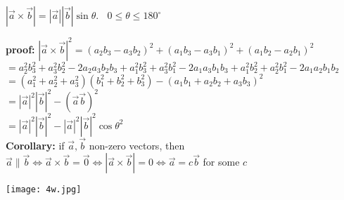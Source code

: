 \begin{theorem}
$|\overrightarrow{a}\times\overrightarrow{b}|=|\overrightarrow{a}||\overrightarrow{b}|\sin{\theta}.~~~~0\leq\theta\leq180^\circ$\\
\end{theorem}
{\color{smalt(darkpowderblue)}\textbf{proof:}}
$|\overrightarrow{a}\times\overrightarrow{b}|^2=(a_2b_3-a_3b_2)^2+(a_1b_3-a_3b_1)^2+(a_1b_2-a_2b_1)^2$\\
$=a_2^2b_3^2+a_3^2b_2^2-2a_2a_3b_2b_3+a_1^2b_3^2+a_3^2b_1^2-2a_1a_3b_1b_3+a_1^2b_2^2+a_2^2b_1^2-2a_1a_2b_1b_2$\\
$=(a_1^2+a_2^2+a_3^2)(b_1^2+b_2^2+b_3^2)-(a_1b_1+a_2b_2+a_3b_3)^2$\\
$=|\overrightarrow{a}|^2|\overrightarrow{b}|^2-(\overrightarrow{a}\overrightarrow{b})^2$\\
$=|\overrightarrow{a}|^2|\overrightarrow{b}|^2-|\overrightarrow{a}|^2|\overrightarrow{b}|^2\cos\theta^2$\\
\noindent{\color{smalt(darkpowderblue)}\rule{\linewidth}{.2mm}}
{\color{smalt(darkpowderblue)}\textbf{Corollary:}}
if $\overrightarrow{a},\overrightarrow{b}$ non-zero vectors, then\\
$\overrightarrow{a}\parallel\overrightarrow{b}\iff \overrightarrow{a}\times\overrightarrow{b}=\overrightarrow{0}\iff |\overrightarrow{a}\times\overrightarrow{b}|=0\iff\overrightarrow{a}=c\overrightarrow{b}$ for some $c$\\
\begin{center}
    \texttt{[image: 4w.jpg]}
\end{center}